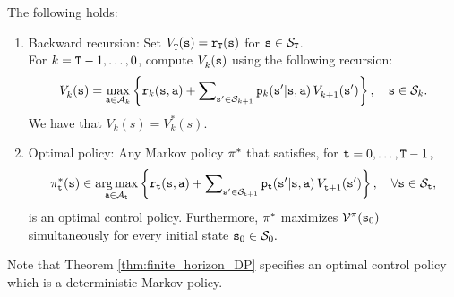 \begin{theorem}\label{thm:finite_horizon_DP}
The following holds:
\begin{enumerate}
\item
Backward recursion:  Set $V_{\tt T}^{}({\tt s}) = {{\tt r}_{\tt T}}({\tt s})$ for ${\tt s}\in {\mathcal{S}_{\tt T}}$.\\
     For $k = {\tt T} -1, \ldots ,0$, compute $V_k^{}({\tt s})$ using the following recursion:
\[V_k^{}({\tt s}) = \mathop {\max }\limits_{{\tt a} \in {\mathcal{A}_k}} \left\{ {{{\tt r}_k}({\tt s},{\tt a}) + \sum\nolimits_{{\tt s}' \in {\mathcal{S}_{k + 1}}} {{{\tt p}_k}({\tt s}'|{\tt s},{\tt a})\,} V_{k + 1}^{}({\tt s}')} \right\},  \quad  {\tt s} \in {\mathcal{S}_k}.\]
We have that $V_k(s)=V^*_k(s)$.
\item
Optimal policy: Any Markov policy ${\pi ^*}$ that satisfies, for ${\tt t} = 0, \ldots ,{\tt T} -1$,
\[\pi _{\tt t}^*({\tt s}) \in \mathop {\arg \max }\limits_{{\tt a} \in {\mathcal{A}_{\tt t}}} \left\{ {{{\tt r}_{\tt t}}({\tt s},{\tt a}) + \sum\nolimits_{{\tt s}' \in {\mathcal{S}_{{\tt t}+ 1}}} {{{\tt p}_{\tt t}}({\tt s}'|{\tt s},{\tt a})\,} V_{{\tt t} + 1}^{}({\tt s}')} \right\},\quad \forall {\tt s} \in {\mathcal{S}_{\tt t}},\]
is an optimal control policy. Furthermore, ${\pi ^*}$ maximizes
${\mathcal{V}^\pi }({{\tt s}_0})$ simultaneously for every initial state
${{\tt s}_0} \in {\mathcal{S}_0}.$
\end{enumerate}
\end{theorem}
Note that Theorem \ref{thm:finite_horizon_DP} specifies an optimal control policy which is a deterministic Markov policy.

